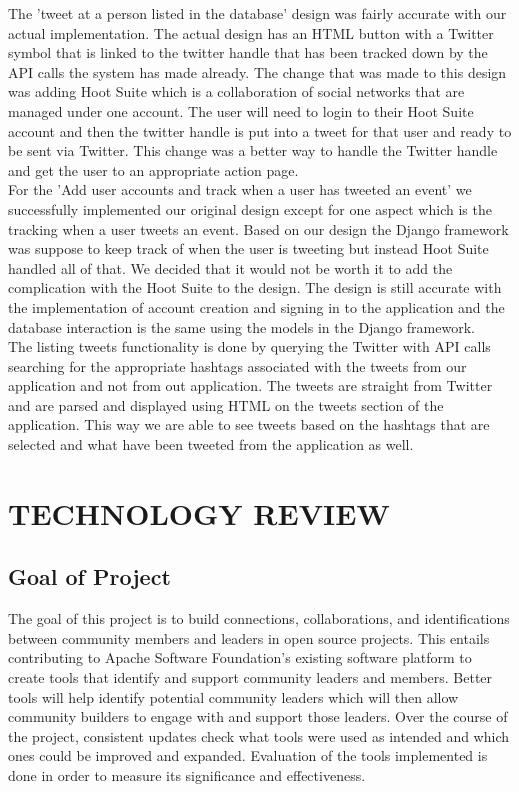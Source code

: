 \documentclass[draftclsnofoot,10pt,onecolumn]{IEEEtran} %
\begin{document}
The 'tweet at a person listed in the database' design was fairly accurate with our actual implementation. The actual design has an HTML button with a Twitter symbol that is linked to the twitter handle that has been tracked down by the API calls the system has made already. The change that was made to this design was adding Hoot Suite which is a collaboration of social networks that are managed under one account. The user will need to login to their Hoot Suite account and then the twitter handle is put into a tweet for that user and ready to be sent via Twitter. This change was a better way to handle the Twitter handle and get the user to an appropriate action page. \\

For the 'Add user accounts and track when a user has tweeted an event' we successfully implemented our original design except for one aspect which is the tracking when a user tweets an event. Based on our design the Django framework was suppose to keep track of when the user is tweeting but instead Hoot Suite handled all of that. We decided that it would not be worth it to add the complication with the Hoot Suite to the design. The design is still accurate with the implementation of account creation and signing in to the application and the database interaction is the same using the models in the Django framework. \\

The listing tweets functionality is done by querying the Twitter with API calls searching for the appropriate hashtags associated with the tweets from our application and not from out application. The tweets are straight from Twitter and are parsed and displayed using HTML on the tweets section of the application. This way we are able to see tweets based on the hashtags that are selected and what have been tweeted from the application as well. \\

\section{TECHNOLOGY REVIEW}

\subsection{Goal of Project} 
The goal of this project is to build connections, collaborations, and identifications between community members and leaders
in open source projects. This entails contributing to Apache Software Foundation’s existing software platform to create tools
that identify and support community leaders and members. Better tools will help identify potential community leaders which
will then allow community builders to engage with and support those leaders. Over the course of the project, consistent
updates check what tools were used as intended and which ones could be improved and expanded. Evaluation of the tools
implemented is done in order to measure its significance and effectiveness. 
\end{document}

